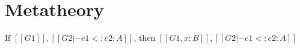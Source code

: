 \section{Metatheory}

\begin{theorem}[Weakening]
    If $[[G1]] , [[G2 |- e1 <: e2 : A]]$, then $[[G1 , x : B]] , [[G2 |- e1 <: e2 : A]]$
\end{theorem}
